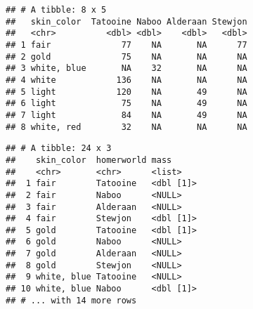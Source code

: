 \documentclass[]{book}
\newenvironment{Shaded}{\begin{snugshade}}{\end{snugshade}}
\newcommand{\DataTypeTok}[1]{\textcolor[rgb]{0.13,0.29,0.53}{#1}}
\newcommand{\DecValTok}[1]{\textcolor[rgb]{0.00,0.00,0.81}{#1}}
\newcommand{\KeywordTok}[1]{\textcolor[rgb]{0.13,0.29,0.53}{\textbf{#1}}}
\newcommand{\NormalTok}[1]{#1}
\newcommand{\OperatorTok}[1]{\textcolor[rgb]{0.81,0.36,0.00}{\textbf{#1}}}
\newcommand{\StringTok}[1]{\textcolor[rgb]{0.31,0.60,0.02}{#1}}
\begin{document}
\begin{verbatim}
## # A tibble: 8 x 5
##   skin_color  Tatooine Naboo Alderaan Stewjon
##   <chr>          <dbl> <dbl>    <dbl>   <dbl>
## 1 fair              77    NA       NA      77
## 2 gold              75    NA       NA      NA
## 3 white, blue       NA    32       NA      NA
## 4 white            136    NA       NA      NA
## 5 light            120    NA       49      NA
## 6 light             75    NA       49      NA
## 7 light             84    NA       49      NA
## 8 white, red        32    NA       NA      NA
\end{verbatim}

\begin{Shaded}
\end{Shaded}

\begin{verbatim}
## # A tibble: 24 x 3
##    skin_color  homerworld mass     
##    <chr>       <chr>      <list>   
##  1 fair        Tatooine   <dbl [1]>
##  2 fair        Naboo      <NULL>   
##  3 fair        Alderaan   <NULL>   
##  4 fair        Stewjon    <dbl [1]>
##  5 gold        Tatooine   <dbl [1]>
##  6 gold        Naboo      <NULL>   
##  7 gold        Alderaan   <NULL>   
##  8 gold        Stewjon    <NULL>   
##  9 white, blue Tatooine   <NULL>   
## 10 white, blue Naboo      <dbl [1]>
## # ... with 14 more rows
\end{verbatim}

\begin{Shaded}
\end{Shaded}
\end{document}
